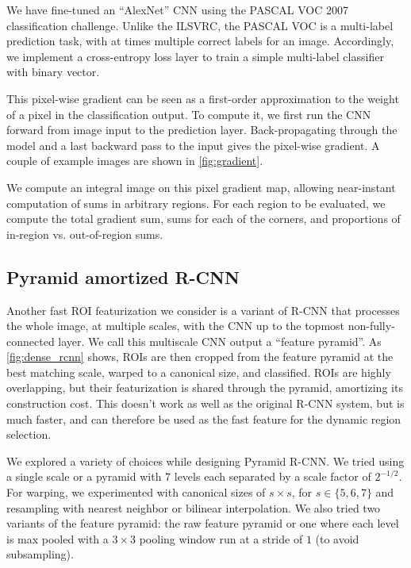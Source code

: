 We have fine-tuned an ``AlexNet'' \cite{Krizhevsky-NIPS-2012} CNN using the PASCAL VOC 2007 classification challenge.
Unlike the ILSVRC, the PASCAL VOC is a multi-label prediction task, with at times multiple correct labels for an image.
Accordingly, we implement a cross-entropy loss layer to train a simple multi-label classifier with binary vector.

This pixel-wise gradient can be seen as a first-order approximation to the weight of a pixel in the classification output.
To compute it, we first run the CNN forward from image input to the prediction layer.
Back-propagating through the model and a last backward pass to the input gives the pixel-wise gradient.
A couple of example images are shown in \autoref{fig:gradient}.

We compute an integral image on this pixel gradient map, allowing near-instant computation of sums in arbitrary regions.
For each region to be evaluated, we compute the total gradient sum, sums for each of the corners, and proportions of in-region vs. out-of-region sums.


\subsection{Pyramid amortized R-CNN}\label{sec:dense}

Another fast ROI featurization we consider is a variant of R-CNN that processes the whole image, at multiple scales, with the CNN up to the topmost non-fully-connected layer.
We call this multiscale CNN output a ``feature pyramid''.
As \autoref{fig:dense_rcnn} shows, ROIs are then cropped from the feature pyramid at the best matching scale, warped to a canonical size, and classified.
ROIs are highly overlapping, but their featurization is shared through the pyramid, amortizing its construction cost.
This doesn't work as well as the original R-CNN system, but is much faster, and can therefore be used as the fast feature for the dynamic region selection.


We explored a variety of choices while designing Pyramid R-CNN.
We tried using a single scale or a pyramid with 7 levels each separated by a scale factor of $2^{-1/2}$.
For warping, we experimented with canonical sizes of $s \times s$, for $s \in \{5,6,7\}$ and resampling with nearest neighbor or bilinear interpolation.
We also tried two variants of the feature pyramid: the raw feature pyramid or one where each level is max pooled with a $3 \times 3$ pooling window run at a stride of $1$ (to avoid subsampling).

